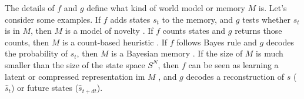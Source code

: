 \documentclass[9pt,twocolumn,twoside]{pnas-new}
\newtheorem{axiom}{Axiom}
\begin{document}
The details of $f$ and $g$ define what kind of world model or memory $M$ is. Let's consider some examples. If $f$ adds states $s_t$ to the memory, and $g$ tests whether $s_t$ is in $M$, then $M$ is a model of novelty \cite{Kakade2002}. If $f$ counts states and $g$ returns those counts, then $M$ is a count-based heuristic \cite{Bellemare2016,Dayan1993}. If $f$ follows Bayes rule and $g$ decodes the probability of $s_t$, then $M$ is a Bayesian memory \cite{Itti2009,Friston2016,Tenenbaum2006,Schmidhuber1991,Pathak2017,Friston2016}. If the size of $M$ is much smaller than the size of the state space $S^N$, then $f$ can be seen as learning a latent or compressed representation im $M$ \cite{Kingma2013,Schmidhuber2008,Levi-Aharoni2019,Ganguli2010,Ha2018,Schmidhuber2015a,Mante2013,Park2017}, and $g$ decodes a reconstruction of $s$ ($\hat s_t$) or future states ($\hat s_{t+dt}$).
 
\end{document}
